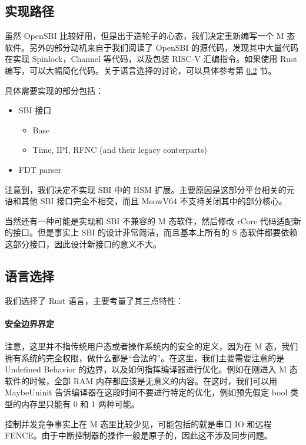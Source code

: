 \documentclass[UTF-8]{ctexart}
\begin{document}
  \subsection{实现路径}

  虽然 OpenSBI 比较好用，但是出于造轮子的心态，我们决定重新编写一个 M 态软件。另外的部分动机来自于我们阅读了 OpenSBI 的源代码，发现其中大量代码在实现 Spinlock，Channel 等代码，以及包装 RISC-V 汇编指令。如果使用 Rust 编写，可以大幅简化代码。关于语言选择的讨论，可以具体参考第 \ref{sec:lang} 节。

  具体需要实现的部分包括：

  \begin{itemize}
    \item SBI 接口
    \begin{itemize}
      \item Base
      \item Time, IPI, RFNC (and their legacy conterparts)
    \end{itemize}
    \item FDT parser
  \end{itemize}

  注意到，我们决定不实现 SBI 中的 HSM 扩展。主要原因是这部分平台相关的元语和其他 SBI 接口完全不相交，而且 MeowV64 不支持关闭其中的部分核心。

  当然还有一种可能是实现和 SBI 不兼容的 M 态软件，然后修改 rCore 代码适配新的接口。但是事实上 SBI 的设计非常简洁，而且基本上所有的 S 态软件都要依赖这部分接口，因此设计新接口的意义不大。

  \subsection{语言选择}
  \label{sec:lang}
  我们选择了 Rust 语言，主要考量了其三点特性：
  
  \paragraph{安全边界界定} 注意，这里并不指传统用户态或者操作系统内的安全的定义，因为在 M 态，我们拥有系统的完全权限，做什么都是“合法的”。在这里，我们主要需要注意的是 Undefined Behavior 的边界，以及如何指挥编译器进行优化。例如在刚进入 M 态软件的时候，全部 RAM 内存都应该是无意义的内容。在这时，我们可以用 MaybeUninit 告诉编译器在这段时间不要进行特定的优化，例如预先假定 bool 类型的内存里只能有 0 和 1 两种可能。

  控制并发竞争事实上在 M 态里比较少见，可能包括的就是串口 IO 和远程 FENCE。由于中断控制器的操作一般是原子的，因此这不涉及同步问题。
\end{document}
